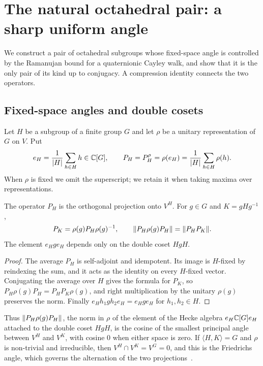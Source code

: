 \section{The natural octahedral pair: a sharp uniform angle}
\label{sec:octahedral-pair}

We construct a pair of octahedral subgroups whose fixed-space angle is
controlled by the Ramanujan bound for a quaternionic Cayley walk, and
show that it is the only pair of its kind up to conjugacy. A compression
identity connects the two operators.

\subsection{Fixed-space angles and double cosets}
\label{subsec:hecke-boundary}
Let $H$ be a subgroup of a finite group $G$ and let $\rho$ be a unitary
representation of $G$ on $V$. Put
\[
  e_H=\frac1{\lvert H \rvert}\sum_{h\in H}h\in\mathbb{C}[G],
  \qquad
  P_H=P_H^\rho=\rho(e_H)=\frac1{\lvert H \rvert}\sum_{h\in H}\rho(h).
\]
When $\rho$ is fixed we omit the superscript; we retain it when taking
maxima over representations.

\begin{lemma}
\label{cor:double-coset-angle}
The operator $P_H$ is the orthogonal projection onto $V^H$. For $g\in G$
and $K=gHg^{-1}$,
\[
  P_K=\rho(g)P_H\rho(g)^{-1},
  \qquad
  \lVert P_H\rho(g)P_H \rVert=\lVert P_HP_K \rVert.
\]
The element $e_Hge_H$ depends only on the double coset $HgH$.
\end{lemma}
\begin{proof}
The average $P_H$ is self-adjoint and idempotent. Its image is $H$-fixed
by reindexing the sum, and it acts as the identity on every $H$-fixed
vector. Conjugating the average over $H$ gives the formula for $P_K$, so
$P_H\rho(g)P_H=P_HP_K\rho(g)$, and right multiplication by the unitary
$\rho(g)$ preserves the norm. Finally $e_Hh_1gh_2e_H=e_Hge_H$ for
$h_1,h_2\in H$.
\end{proof}

Thus $\lVert P_H\rho(g)P_H \rVert$, the norm in $\rho$ of the element of the
Hecke algebra $e_H\mathbb{C}[G]e_H$ attached to the double coset $HgH$, is the
cosine of the smallest principal angle between $V^H$ and $V^K$, with
cosine $0$ when either space is zero. If $\langle H,K\rangle=G$ and
$\rho$ is non-trivial and irreducible, then $V^H\cap V^K=V^G=0$, and
this is the Friedrichs angle, which governs the alternation of the two
projections~\cite{KayalarWeinert1988,BadeaGrivauxMuller2010}.

